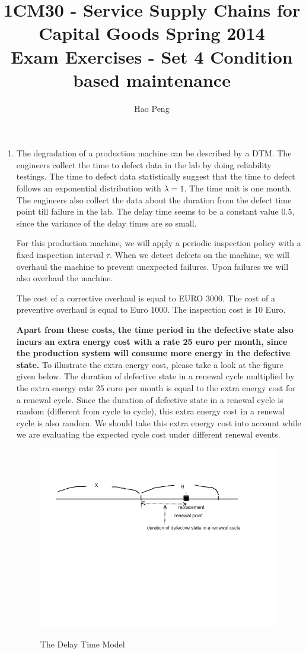 \documentclass[10pt,a4paper]{article}
\author{Hao Peng}
\title{1CM30 - Service Supply Chains for Capital Goods
Spring 2014 \\
Exam Exercises - Set 4
Condition based maintenance \\
}
\begin{document}
\maketitle
\begin{enumerate}
\item The degradation of a production machine can be described by a DTM. The engineers collect the time to defect data in the lab by doing reliability testings. The time to defect data statistically suggest that the time to defect follows an exponential distribution with $\lambda=1$. The time unit is one month. The engineers also collect the data about the duration from the defect time point till failure in the lab. The delay time seems to be a constant value $0.5$, since the variance of the delay times are so small. 

For this production machine, we will apply a periodic inspection policy with a fixed inspection interval $\tau$. When we detect defects on the machine, we will overhaul the machine to prevent unexpected failures. Upon failures we will also overhaul the machine. 

The cost of a corrective overhaul is equal to EURO 3000. The cost of a preventive overhaul is equal to Euro 1000. The inspection cost is 10 Euro. 

\textbf{Apart from these costs, the time period in the defective state also incurs an extra energy cost with a rate 25 euro per month, since the production system will consume more energy in the defective state.} To illustrate the extra energy cost, please take a look at the figure given below. The duration of defective state in a renewal cycle multiplied by the extra energy rate 25 euro per month is equal to the extra energy cost for a renewal cycle. Since the duration of defective state in a renewal cycle is random (different from cycle to cycle), this extra energy cost in a renewal cycle is also random. We should take this extra energy cost into account while we are evaluating the expected cycle cost under different renewal events.
\begin{figure}[h!!!]  %
  \centering
  \includegraphics[width=6in]{exam1.png}\\
  \footnotesize
  \caption{ \footnotesize{ The Delay Time Model} }\label{DTM1}
\end{figure}



\end{enumerate}
\end{document}
